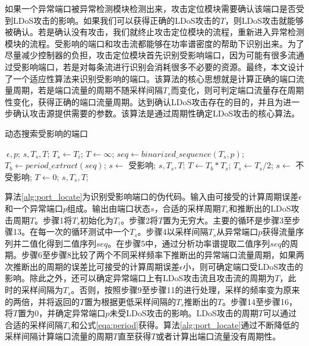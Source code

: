 如果一个异常端口被异常检测模块检测出来，攻击定位模块需要确认该端口是否受到LDoS攻击的影响。如果我们可以获得正确的LDoS攻击的$T$，则LDoS攻击就能够被确认。若是确认没有攻击，我们就终止攻击定位模块的流程，重新进入异常检测模块的流程。受影响的端口和攻击流都能够在功率谱密度的帮助下识别出来。为了尽量减少控制器的负担，攻击定位模块首先识别受影响端口，因为可能有很多流通过受影响端口，若是对每条流进行识别会消耗很多不必要的资源。最终，本文设计了一个适应性算法来识别受影响的端口。该算法的核心思想就是计算正确的端口流量周期，若是端口流量的周期不随采样间隔$T_s$而变化，则可判定端口流量存在周期性变化，获得正确的端口流量周期。达到确认LDoS攻击存在的目的，并且为进一步确认攻击源提供需要的参数。该算法是通过周期性确定LDoS攻击的核心算法。

\begin{algorithm}[H]
	\caption{动态搜索受影响的端口}
	\label{alg:port_locate}
	\begin{algorithmic}[1]
		\Require $~{\epsilon}, p$;
		\Ensure $s, T_s, T$;
		\State $T_s \gets T_i$;
		\State $T \gets \infty$; 
		\State $seq \gets binarized\_sequence(T_s, p)$;
		\State $T_b \gets period\_extract(seq)$;
		\State $s \gets$ 受影响;
		\State \Return $s, T_s, T$;
		\Else
		\State $T \gets T_b * T_s$;
		\State $T_s \gets T_s / 2$;
		\EndIf 
		\EndWhile
		\State $s \gets$ 不受影响;
		\State $T \gets 0$; 
		\State \Return $s, T_s, T$;
	\end{algorithmic}
\end{algorithm}

算法\ref{alg:port_locate}为识别受影响端口的伪代码。输入由可接受的计算周期误差$\epsilon$和一个异常端口$p$组成。输出由端口状态$s$，合适的采样周期$T_s$和推断出的LDoS攻击周期$T$。步骤1将$T_s$初始化为$T_i$。步骤2将$T$置为无穷大。主要的循环是步骤3至步骤13。在每一次的循环测试中一个$T_s$。步骤4以采样间隔$T_s$从异常端口$p$获得流量序列并二值化得到二值序列$seq$。在步骤5中，通过分析功率谱提取二值序列$seq$的周期。步骤6至步骤8比较了两个不同采样频率下推断出的异常端口流量周期，如果两次推断出的周期的误差比可接受的计算周期误差$\epsilon$小，则可确定端口受LDoS攻击的影响。除此之外，还可以确定异常端口上有LDoS攻击流且攻击流的周期为$T$，此时的采样间隔为$T_s$。否则，按照步骤9至步骤11的进行处理，采样的频率变为原来的两倍，并将返回的$T$置为根据更低采样间隔的$T_s$推断出的$T$。步骤14至步骤16，将$T$置为0，并确定异常端口$p$未受LDoS攻击的影响。LDoS攻击的周期$T$可以通过合适的采样间隔$T_s$和公式\ref{eqa:period}获得。算法\ref{alg:port_locate}通过不断降低的采样间隔计算端口流量的周期$T$直至获得$T$或者计算出端口流量没有周期性。

